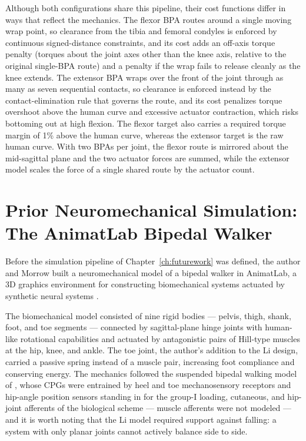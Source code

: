 Although both configurations share this pipeline, their cost functions differ in ways that reflect the mechanics. The flexor BPA routes around a single moving wrap point, so clearance from the tibia and femoral condyles is enforced by continuous signed-distance constraints, and its cost adds an off-axis torque penalty (torques about the joint axes other than the knee axis, relative to the original single-BPA route) and a penalty if the wrap fails to release cleanly as the knee extends. The extensor BPA wraps over the front of the joint through as many as seven sequential contacts, so clearance is enforced instead by the contact-elimination rule that governs the route, and its cost penalizes torque overshoot above the human curve and excessive actuator contraction, which risks bottoming out at high flexion. The flexor target also carries a required torque margin of 1\% above the human curve, whereas the extensor target is the raw human curve. With two BPAs per joint, the flexor route is mirrored about the mid-sagittal plane and the two actuator forces are summed, while the extensor model scales the force of a single shared route by the actuator count.

\section{Prior Neuromechanical Simulation: The AnimatLab Bipedal Walker}\label{sec:prior_walker}

Before the simulation pipeline of Chapter~\ref{ch:futurework} was defined, the author and Morrow built a neuromechanical model of a bipedal walker in AnimatLab, a 3D graphics environment for constructing biomechanical systems actuated by synthetic neural systems \citep{cofer_animatlab_2010}. 

The biomechanical model consisted of nine rigid bodies --- pelvis, thigh, shank, foot, and toe segments --- connected by sagittal-plane hinge joints with human-like rotational capabilities and actuated by antagonistic pairs of Hill-type muscles at the hip, knee, and ankle. The toe joint, the author's addition to the Li design, carried a passive spring instead of a muscle pair, increasing foot compliance and conserving energy. The mechanics followed the suspended bipedal walking model of \citet{li_bipedal_2017}, whose CPGs were entrained by heel and toe mechanosensory receptors and hip-angle position sensors standing in for the group-I loading, cutaneous, and hip-joint afferents of the biological scheme --- muscle afferents were not modeled --- and it is worth noting that the Li model required support against falling: a system with only planar joints cannot actively balance side to side.

